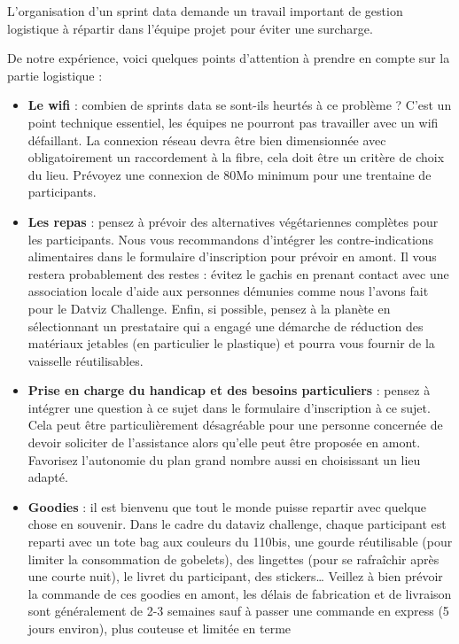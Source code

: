 \documentclass[]{book}
\begin{document}
L'organisation d'un sprint data demande un travail important de gestion
logistique à répartir dans l'équipe projet pour éviter une surcharge.

De notre expérience, voici quelques points d'attention à prendre en
compte sur la partie logistique :

\begin{itemize}
\item
  \textbf{Le wifi} : combien de sprints data se sont-ils heurtés à ce
  problème ? C'est un point technique essentiel, les équipes ne pourront
  pas travailler avec un wifi défaillant. La connexion réseau devra être
  bien dimensionnée avec obligatoirement un raccordement à la fibre,
  cela doit être un critère de choix du lieu. Prévoyez une connexion de
  80Mo minimum pour une trentaine de participants.
\item
  \textbf{Les repas} : pensez à prévoir des alternatives végétariennes
  complètes pour les participants. Nous vous recommandons d'intégrer les
  contre-indications alimentaires dans le formulaire d'inscription pour
  prévoir en amont. Il vous restera probablement des restes : évitez le
  gachis en prenant contact avec une association locale d'aide aux
  personnes démunies comme nous l'avons fait pour le Datviz Challenge.
  Enfin, si possible, pensez à la planète en sélectionnant un
  prestataire qui a engagé une démarche de réduction des matériaux
  jetables (en particulier le plastique) et pourra vous fournir de la
  vaisselle réutilisables.
\item
  \textbf{Prise en charge du handicap et des besoins particuliers} :
  pensez à intégrer une question à ce sujet dans le formulaire
  d'inscription à ce sujet. Cela peut être particulièrement désagréable
  pour une personne concernée de devoir soliciter de l'assistance alors
  qu'elle peut être proposée en amont. Favorisez l'autonomie du plan
  grand nombre aussi en choisissant un lieu adapté.
\item
  \textbf{Goodies} : il est bienvenu que tout le monde puisse repartir
  avec quelque chose en souvenir. Dans le cadre du dataviz challenge,
  chaque participant est reparti avec un tote bag aux couleurs du
  110bis, une gourde réutilisable (pour limiter la consommation de
  gobelets), des lingettes (pour se rafraîchir après une courte nuit),
  le livret du participant, des stickers\ldots{} Veillez à bien prévoir
  la commande de ces goodies en amont, les délais de fabrication et de
  livraison sont généralement de 2-3 semaines sauf à passer une commande
  en express (5 jours environ), plus couteuse et limitée en terme

\end{itemize}
\end{document}
